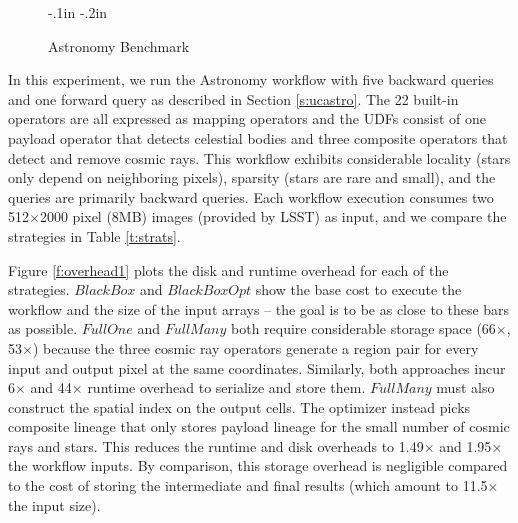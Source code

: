 \begin{figure}[htb]
\advance\leftskip-.1in
\advance\rightskip-.2in
\caption{Astronomy Benchmark}
\label{f:lsst}
\end{figure}


In this experiment, we run the Astronomy workflow with  five backward
queries and one forward query as described in Section \ref{s:ucastro}.  The 22
built-in operators are all expressed as mapping operators and the UDFs consist
of one payload operator that detects celestial bodies and three composite
operators that detect and remove cosmic rays.  This workflow exhibits
considerable locality (stars only depend on neighboring pixels), sparsity
(stars are rare and small), and the queries are primarily backward queries.
Each workflow execution consumes two 512$\times$2000 pixel (8MB) images
(provided by LSST) as input, and we compare the strategies in Table \ref{t:strats}.

Figure \ref{f:overhead1} plots the disk and runtime overhead for each of the
strategies. $BlackBox$ and $BlackBoxOpt$ show the base cost to execute the
workflow and the size of the input arrays -- the goal is to be as close to
these bars as possible.  $FullOne$ and $FullMany$ both require considerable
storage space (66$\times$, 53$\times$) because the three cosmic ray operators
generate a region pair for every input and output pixel at the same
coordinates.  Similarly, both approaches incur 6$\times$ and 44$\times$ runtime
overhead to serialize and store them.  $FullMany$ must also
construct the spatial index on the output cells.  The \sys{} optimizer instead
picks composite lineage that only stores payload lineage for the small
number of cosmic rays and stars.  This reduces the runtime and disk overheads
to 1.49$\times$ and 1.95$\times$ the workflow inputs.  By comparison, this
storage overhead is negligible compared to the cost of storing the intermediate
and final results (which amount to 11.5$\times$ the input size).


